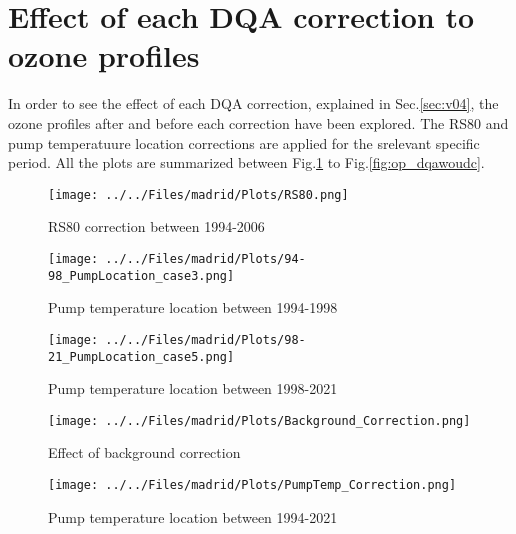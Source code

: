     \section{Effect of each DQA correction to ozone profiles }

    In order to see the effect of each DQA correction, explained in Sec.\ref{sec:v04}, the ozone profiles after and before each correction
    have been explored. The RS80 and pump temperatuure location corrections are applied for the srelevant specific period.
    All the plots are summarized between Fig.\ref{fig:op_rs80} to Fig.\ref{fig:op_dqawoudc}.

                            \begin{figure}
        \centering
\texttt{[image: ../../Files/madrid/Plots/RS80.png]}
    \caption{RS80 correction between 1994-2006}
            \label{fig:op_rs80}
    \end{figure}

                                \begin{figure}
        \centering
\texttt{[image: ../../Files/madrid/Plots/94-98\_PumpLocation\_case3.png]}
    \caption{Pump temperature location between 1994-1998}
            \label{fig:op_pt94}
    \end{figure}

                                    \begin{figure}
        \centering
\texttt{[image: ../../Files/madrid/Plots/98-21\_PumpLocation\_case5.png]}
    \caption{Pump temperature location between 1998-2021}
            \label{fig:op_pt21}
    \end{figure}

                                    \begin{figure}
        \centering
\texttt{[image: ../../Files/madrid/Plots/Background\_Correction.png]}
    \caption{Effect of background correction}
            \label{fig:op_bkg}
    \end{figure}

                                        \begin{figure}
        \centering
\texttt{[image: ../../Files/madrid/Plots/PumpTemp\_Correction.png]}
    \caption{Pump temperature location between 1994-2021}
            \label{fig:op_ptall}
    \end{figure}

